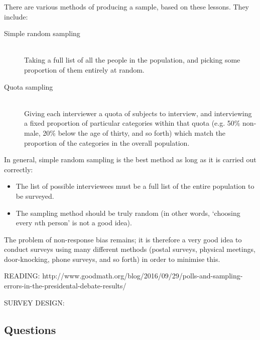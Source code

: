 There are various methods of producing a sample, based on these lessons. They include:
\begin{description}
  \item[Simple random sampling] \hfill \\
    Taking a full list of all the people in the population, and picking some proportion of them entirely at random.
  \item[Quota sampling] \hfill \\
    Giving each interviewer a quota of subjects to interview, and interviewing a fixed proportion of particular categories
    within that quota (e.g. 50\% non-male, 20\% below the age of thirty, and so forth) which match the proportion of the
    categories in the overall population.
\end{description}

In general, simple random sampling is the best method as long as it is carried out correctly:
\begin{itemize}
  \item The list of possible interviewees must be a full list of the entire population to be surveyed.
  \item The sampling method should be truly random (in other words, `choosing every $ n$th person' is not a good idea).
\end{itemize}

The problem of non-response bias remains; it is therefore a very good idea to conduct surveys using many different
methods (postal surveys, physical meetings, door-knocking, phone surveys, and so forth) in order to minimise this.

READING: http://www.goodmath.org/blog/2016/09/29/polls-and-sampling-errors-in-the-presidental-debate-results/

SURVEY DESIGN:


\subsection*{Questions}




